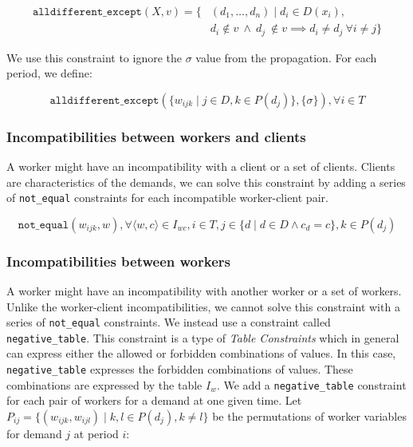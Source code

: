 \documentclass[../../thesis.tex]{subfiles}
\begin{document}
\begin{align*}
   \texttt{alldifferent\_except} (X, v) = \{& (d_1, \dots, d_n) \mid d_i \in D(x_i), \\ 
   & d_i \notin v \ \land \ d_j \ \notin v \implies d_i \neq d_j \ \forall i \neq j \}
\end{align*}

We use this constraint to ignore the $\sigma$ value from the propagation. For each period, we define:

\begin{equation}
  \texttt{alldifferent\_except}( \{w_{ijk} \mid j \in D, k \in P(d_j) \}, \{ \sigma \}), \forall i \in T
\end{equation}

\subsubsection{Incompatibilities between workers and clients}

A worker might have an incompatibility with a client or a set of clients. 
Clients are characteristics of the demands, we can solve this constraint by adding 
a series of \texttt{not\_equal} constraints for each incompatible worker-client pair.

\begin{equation}
  \texttt{not\_equal}(w_{ijk}, w), \forall \langle w, c\rangle \in I_{wc}, i \in T, j \in \{ d \mid d \in D \land c_d = c \}, k \in P(d_j)
\end{equation}

\subsubsection{Incompatibilities between workers}

A worker might have an incompatibility with another worker or a set of workers. 
Unlike the worker-client incompatibilities, we cannot solve this constraint with a series of \texttt{not\_equal} constraints. We instead use a constraint 
called \texttt{negative\_table}. This constraint is a type of \emph{Table Constraints} \cite{Henteryck:Table} which in general can
express either the allowed or forbidden combinations of values. In this case, \texttt{negative\_table} expresses the forbidden combinations of values.
These combinations are expressed by the table $I_{w}$. 
We add a \texttt{negative\_table} constraint for each pair of workers for a demand at one given time. Let $P_{ij} = \{ (w_{ijk}, w_{ijl}) \mid k, l \in P(d_j), k \neq l \}$ 
be the permutations of worker variables for demand $j$ at period $i$:
\end{document}
